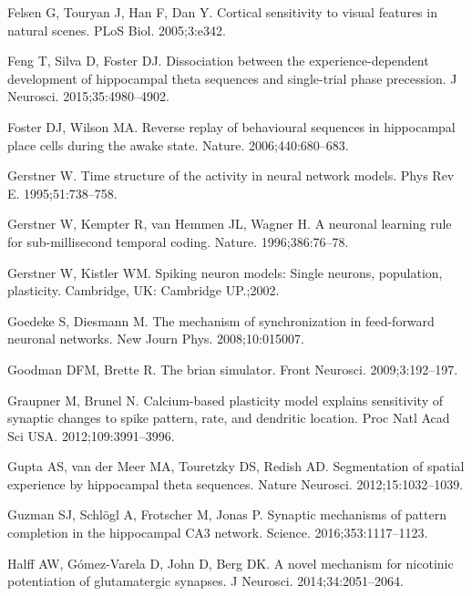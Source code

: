 \begin{thebibliography}{}
Felsen G, Touryan J, Han F, Dan Y.
\newblock Cortical sensitivity to visual features in natural scenes.
\newblock PLoS Biol. 2005;3:e342.

Feng T, Silva D, Foster DJ.
\newblock Dissociation between the experience-dependent development of hippocampal theta sequences and single-trial phase precession.
\newblock J Neurosci. 2015;35:4980--4902.

Foster DJ, Wilson MA.
\newblock Reverse replay of behavioural sequences in hippocampal place cells
  during the awake state.
\newblock Nature. 2006;440:680--683.

Gerstner W.
\newblock Time structure of the activity in neural network models.
\newblock Phys Rev E. 1995;51:738--758.

Gerstner W, Kempter R, van Hemmen JL, Wagner H.
\newblock A neuronal learning rule for sub-millisecond temporal coding.
\newblock Nature. 1996;386:76--78.

Gerstner W, Kistler WM.
\newblock Spiking neuron models: Single neurons, population, plasticity.
\newblock Cambridge, UK: Cambridge UP.;2002.

Goedeke S, Diesmann M.
\newblock The mechanism of synchronization in feed-forward neuronal networks.
\newblock New Journ Phys. 2008;10:015007.

Goodman DFM, Brette R.
\newblock The brian simulator.
\newblock Front Neurosci. 2009;3:192--197.

Graupner M, Brunel N.
\newblock Calcium-based plasticity model explains sensitivity of synaptic changes to spike pattern, rate, and dendritic location.
\newblock Proc Natl Acad Sci USA. 2012;109:3991--3996.

Gupta AS, van der Meer MA, Touretzky DS, Redish AD.
\newblock Segmentation of spatial experience by hippocampal theta sequences.
\newblock Nature Neurosci. 2012;15:1032--1039.

Guzman SJ, Schl\"{o}gl A, Frotscher M, Jonas P.
\newblock Synaptic mechanisms of pattern completion in the hippocampal CA3 network.
\newblock Science. 2016;353:1117--1123.

Halff AW, G{\'o}mez-Varela D, John D, Berg DK.
\newblock A novel mechanism for nicotinic potentiation of glutamatergic
  synapses.
\newblock J Neurosci. 2014;34:2051--2064.


\end{thebibliography}
